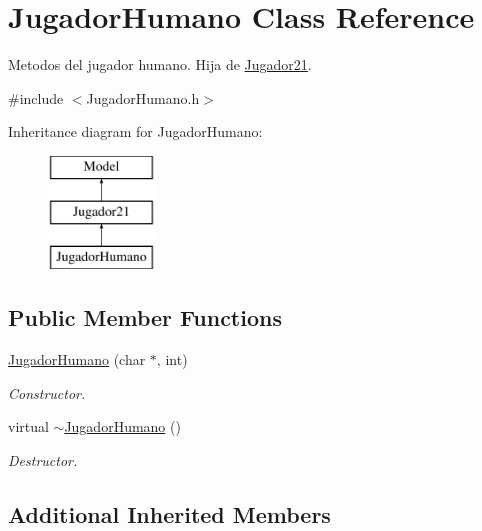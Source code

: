 \hypertarget{class_jugador_humano}{}\section{Jugador\+Humano Class Reference}
\label{class_jugador_humano}


Metodos del jugador humano. Hija de \hyperlink{class_jugador21}{Jugador21}.  




{\ttfamily \#include $<$Jugador\+Humano.\+h$>$}

Inheritance diagram for Jugador\+Humano\+:\begin{figure}[H]
\begin{center}
\leavevmode
\includegraphics[height=3.000000cm]{class_jugador_humano}
\end{center}
\end{figure}
\subsection*{Public Member Functions}
\begin{DoxyCompactItemize}
\item 
\hyperlink{class_jugador_humano_add1814239a072772aa1e8720b2dc69da}{Jugador\+Humano} (char $\ast$, int)
\begin{DoxyCompactList}\small\item\em Constructor. \end{DoxyCompactList}\item 
virtual \hyperlink{class_jugador_humano_a6da9f2a6ff013128e1ceb75e0e871620}{$\sim$\+Jugador\+Humano} ()\hypertarget{class_jugador_humano_a6da9f2a6ff013128e1ceb75e0e871620}{}\label{class_jugador_humano_a6da9f2a6ff013128e1ceb75e0e871620}

\begin{DoxyCompactList}\small\item\em Destructor. \end{DoxyCompactList}\end{DoxyCompactItemize}
\subsection*{Additional Inherited Members}


